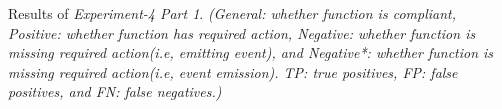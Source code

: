 \begin{table}
\centering
\small
{Results of \textit{Experiment-4 Part 1}.}
{\textit{(General: whether function is compliant, Positive: whether function has required action, Negative: whether function is missing required action(i.e, emitting event), and Negative*: whether function is missing required action(i.e, event emission).
TP: true positives, FP: false positives, and FN: false negatives.)}
}
{
{}
}
\end{table}